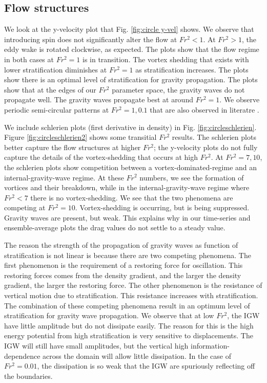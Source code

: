 \subsection{Flow structures}
We look at the y-velocity plot that Fig. \ref{fig:circle y-vel} shows. We observe that introducing spin does not significantly alter the flow at $Fr^2 < 1$. At $Fr^2 > 1$, the eddy wake is rotated clockwise, as expected. The plots show that the flow regime in both cases at $Fr^2 = 1$ is in transition. The vortex shedding that exists with lower stratification diminishes at $Fr^2 = 1$ as stratification increases. The plots show there is an optimal level of stratification for gravity propagation. The plots show that at the edges of our $Fr^2$ parameter space, the gravity waves do not propagate well. The gravity waves propagate best at around $Fr^2 = 1$. We observe periodic semi-circular patterns at $Fr^2 = 1, 0.1$ that are also observed in literatre \cite{ortiz-tarin_stratified_2019}.
 
We include schlerien plots (first derivative in density) in Fig. \ref{fig:circleschlerien}. Figure \ref{fig:circleschlerien2} shows some transitial $Fr^2$ results. The schlerien plots better capture the flow structures at higher $Fr^2$; the y-velocity plots do not fully capture the details of the vortex-shedding that occurs at high $Fr^2$. At $Fr^2 = 7, 10$, the schlerien plots show competition between a vortex-dominated-regime and an internal-gravity-wave regime. At these $Fr^2$ numbers, we see the formation of vortices and their breakdown, while in the internal-gravity-wave regime where $Fr^2 < 7$ there is no vortex-shedding. We see that the two phenomena are competing at $Fr^2 = 10$. Vortex-shedding is occurring, but is being suppressed. Gravity waves are present, but weak. This explains why in our time-series and ensemble-average plots the drag values do not settle to a steady value.
 
The reason the strength of the propagation of gravity waves as function of stratification is not linear is because there are two competing phenomena. The first phenomenon is the requirement of a restoring force for oscillation. This restoring forces comes from the density gradient, and the larger the density gradient, the larger the restoring force. The other phenomenon is the resistance of vertical motion due to stratification. This resistance increases with stratification. The combination of these competing phenomena result in an optimum level of stratification for gravity wave propagation. We observe that at low $Fr^2$, the IGW have little amplitude but do not dissipate easily. The reason for this is the high energy potential from high stratification is very sensitive to displacements. The IGW will still have small amplitudes, but the vertical high information-dependence across the domain will allow little dissipation. In the case of $Fr^2 = 0.01$, the dissipation is so weak that the IGW are spuriously reflecting off the boundaries.
 
